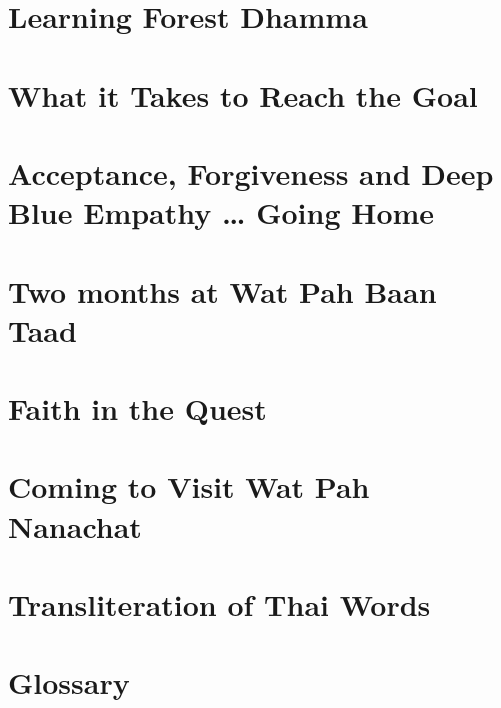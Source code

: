 \documentclass[11pt,twoside,final]{memoir}
\begin{document}
\chapter{Learning Forest Dhamma}


\chapter{What it Takes to Reach the Goal}


\chapter{Acceptance, Forgiveness and Deep Blue Empathy \ldots{} Going Home}


\chapter{Two months at Wat Pah Baan Taad}


\chapter{Faith in the Quest}


\chapter{Coming to Visit Wat Pah Nanachat}


\chapter{Transliteration of Thai Words}

\chapter{Glossary}
\end{document}
